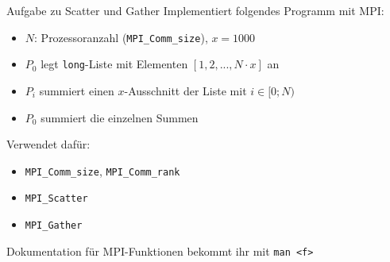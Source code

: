 \documentclass{beamer}
\begin{document}
\begin{frame}{Aufgabe zu Scatter und Gather}
	Implementiert folgendes Programm mit MPI:

	\begin{itemize}
		\item $N$: Prozessoranzahl (\texttt{MPI\_Comm\_size}), $x = 1000$
		\item $P_0$ legt \texttt{long}-Liste mit Elementen $[1, 2, ..., N \cdot x]$ an
		\item $P_i$ summiert einen $x$-Ausschnitt der Liste mit $i \in [0;N)$
		\item $P_0$ summiert die einzelnen Summen
	\end{itemize}

	Verwendet dafür:

	\begin{itemize}
		\item \texttt{MPI\_Comm\_size}, \texttt{MPI\_Comm\_rank}
		\item \texttt{MPI\_Scatter}
		\item \texttt{MPI\_Gather}
	\end{itemize}

	Dokumentation für MPI-Funktionen bekommt ihr mit \texttt{man <f>}
\end{frame}
\end{document}
